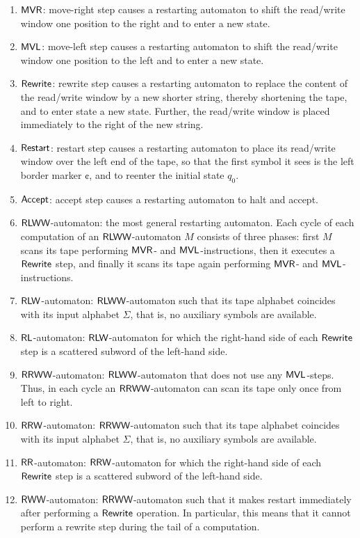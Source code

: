 \begin{enumerate}[]
\item $\textup{\sf MVR}$: move-right step causes a restarting automaton to shift the read/write window one position to the right and to enter a new state.
\item $\textup{\sf MVL}$: move-left step causes a restarting automaton to shift the read/write window one position to the left and to enter a new state.
\item $\textup{\sf Rewrite}$: rewrite step causes a restarting automaton to replace the content of the read/write window by a new shorter string, thereby shortening the tape, and to enter state a new state. Further, the read/write window is placed immediately to the right of the new string.
\item $\textup{\sf Restart}$: restart step causes a restarting automaton to place its read/write window over the left end of the tape, so that the first symbol it sees is the left border marker $\cent$, and to reenter the initial state $q_0$.
\item $\textup{\sf Accept}$: accept step causes a restarting automaton to halt and accept.
\item $\textup{\sf RLWW}$-automaton: the most general restarting automaton. Each cycle of each computation of an $\textup{\sf RLWW}$-automaton $M$ consists of three phases: first $M$ scans its tape performing $\textup{\sf MVR}$- and $\textup{\sf MVL}$-instructions, then it executes a $\textup{\sf Rewrite}$ step, and finally it scans its tape again performing $\textup{\sf MVR}$- and $\textup{\sf MVL}$-instructions.
\item $\textup{\sf RLW}$-automaton: $\textup{\sf RLWW}$-automaton such that its tape alphabet coincides with its input alphabet $\Sigma$, that is, no auxiliary symbols are available.
\item $\textup{\sf RL}$-automaton: $\textup{\sf RLW}$-automaton for which the right-hand side of each $\textup{\sf Rewrite}$ step is a scattered subword of the left-hand side.
\item $\textup{\sf RRWW}$-automaton: $\textup{\sf RLWW}$-automaton that does not use any $\textup{\sf MVL}$-steps. Thus, in each cycle an $\textup{\sf RRWW}$-automaton can scan its tape only once from left to right.
\item $\textup{\sf RRW}$-automaton: $\textup{\sf RRWW}$-automaton such that its tape alphabet coincides with its input alphabet $\Sigma$, that is, no auxiliary symbols are available.
\item $\textup{\sf RR}$-automaton: $\textup{\sf RRW}$-automaton for which the right-hand side of each $\textup{\sf Rewrite}$ step is a scattered subword of the left-hand side.
\item $\textup{\sf RWW}$-automaton: $\textup{\sf RRWW}$-automaton such that it makes restart immediately after performing a $\textup{\sf Rewrite}$ operation. In particular, this means that it cannot perform a rewrite step during the tail of a computation.

\end{enumerate}
